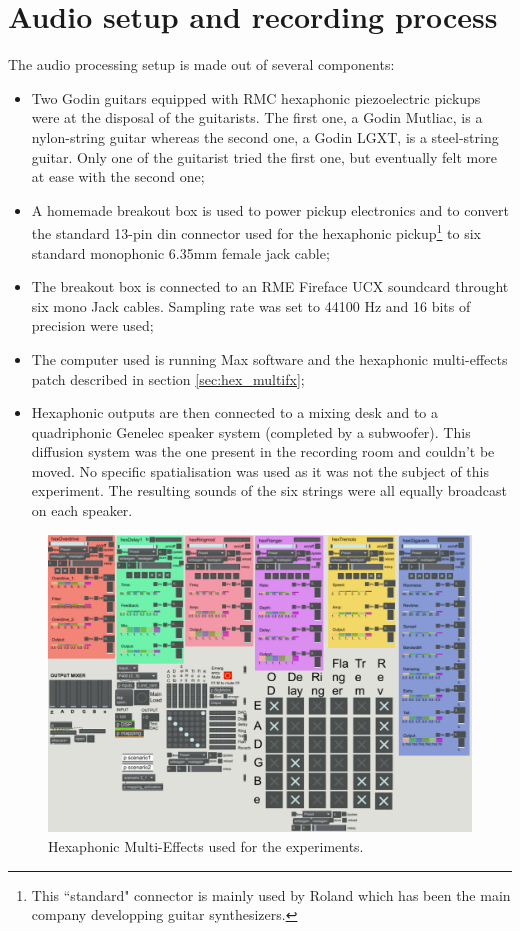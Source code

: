 \documentclass{article}
\begin{document}
\section{Audio setup and recording process}\label{sec:setup}
The audio processing setup is made out of several components: 
\begin{itemize}
    \item Two Godin guitars equipped with RMC hexaphonic piezoelectric pickups were at the disposal of the guitarists. 
    The first one, a Godin Mutliac, is a nylon-string guitar whereas the second one, a Godin LGXT, is a steel-string 
    guitar. Only one of the guitarist tried the first one, but eventually felt more at ease with the second one;
    \item A homemade breakout box is used to power pickup electronics and to convert the standard 13-pin din connector 
    used for the hexaphonic pickup\footnote{This ``standard" connector is mainly used by Roland which has been the main company developping guitar synthesizers.} to six standard monophonic 6.35mm female jack cable;
    \item The breakout box is connected to an RME Fireface UCX soundcard throught six mono Jack cables. Sampling rate was 
    set to 44100 Hz and 16 bits of precision were used;
	\item The computer used is running Max software and the hexaphonic multi-effects patch described in section \ref{sec:hex_multifx};
    \item Hexaphonic outputs are then connected to a mixing desk and to a quadriphonic Genelec speaker system (completed by a
    subwoofer). This diffusion system was the one present in the recording room and couldn't be moved. No specific
    spatialisation was used as it was not the subject of this experiment. The resulting sounds of the six strings were all equally broadcast on each speaker.
    
\end{itemize}

\begin{figure}
    \centering
    \includegraphics[scale=0.3]{figures/191025-Patch-experience.png}
    \caption{Hexaphonic Multi-Effects used for the experiments.}
    \label{fig:hex-multi-effects}
\end{figure}
\end{document}
